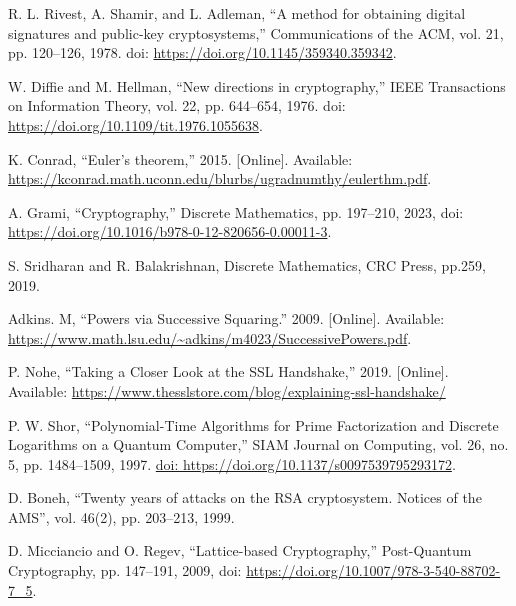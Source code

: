 \documentclass{article}
\begin{document}
\clearpage
\begin{thebibliography}{9}
 R. L. Rivest, A. Shamir, and L. Adleman, “A method for obtaining digital signatures and public-key cryptosystems,” Communications of the ACM, vol. 21, pp. 120–126, 1978. doi: \url{https://doi.org/10.1145/359340.359342}.

 W. Diffie and M. Hellman, “New directions in cryptography,” IEEE Transactions on Information Theory, vol. 22, pp. 644–654, 1976. doi: \url{https://doi.org/10.1109/tit.1976.1055638}.

 K. Conrad, “Euler’s theorem,” 2015. [Online]. Available: \url{https://kconrad.math.uconn.edu/blurbs/ugradnumthy/eulerthm.pdf}.

 A. Grami, “Cryptography,” Discrete Mathematics, pp. 197–210, 2023, doi: \url{https://doi.org/10.1016/b978-0-12-820656-0.00011-3}.

 S. Sridharan and R. Balakrishnan, Discrete Mathematics, CRC Press, pp.259, 2019.

 Adkins. M, “Powers via Successive Squaring.” 2009. [Online]. Available: \url{https://www.math.lsu.edu/\~adkins/m4023/SuccessivePowers.pdf}.

 P. Nohe, “Taking a Closer Look at the SSL Handshake,” 2019. [Online]. Available: \url{https://www.thesslstore.com/blog/explaining-ssl-handshake/‌}‌

 P. W. Shor, “Polynomial-Time Algorithms for Prime Factorization and Discrete Logarithms on a Quantum Computer,” SIAM Journal on Computing, vol. 26, no. 5, pp. 1484–1509, 1997. 
\url{doi: https://doi.org/10.1137/s0097539795293172}.

 D. Boneh, “Twenty years of attacks on the RSA cryptosystem. Notices of the AMS”, vol. 46(2), pp. 203–213, 1999.

 D. Micciancio and O. Regev, “Lattice-based Cryptography,” Post-Quantum Cryptography, pp. 147–191, 2009, doi: \url{https://doi.org/10.1007/978-3-540-88702-7\_5}.
\end{thebibliography}
\end{document}
